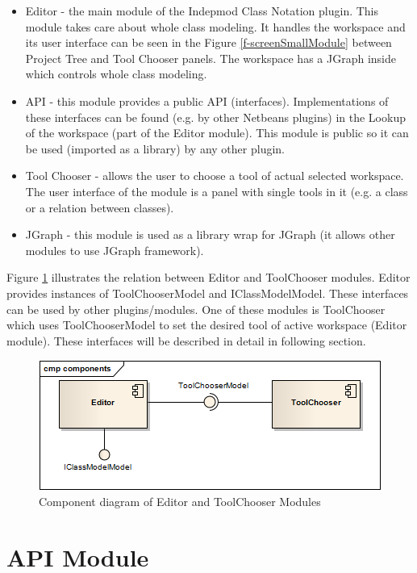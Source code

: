 \begin{itemize}
	\item Editor - the main module of the Indepmod Class Notation plugin. This module takes care about whole class modeling. It handles the workspace and its user interface can be seen in the Figure \ref{f-screenSmallModule} between Project Tree and Tool Chooser panels. The workspace has a JGraph inside which controls whole class modeling.
    \item API - this module provides a public API (interfaces). Implementations of these interfaces can be found (e.g. by other Netbeans plugins) in the Lookup of the workspace (part of the Editor module). This module is public so it can be used (imported as a library) by any other plugin.
    \item Tool Chooser - allows the user to choose a tool of actual selected workspace. The user interface of the module is a panel with single tools in it (e.g. a class or a relation between classes).
    \item JGraph - this module is used as a library wrap for JGraph (it allows other modules to use JGraph framework).
\end{itemize} 

Figure \ref{f-Editor_ToolChooser_Components} illustrates the relation between Editor and ToolChooser modules. Editor provides instances of ToolChooserModel and IClassModelModel. These interfaces can be used by other plugins/modules. One of these modules is ToolChooser which uses ToolChooserModel to set the desired tool of active workspace (Editor module). These interfaces will be described in detail in following section.

\begin{figure}[!ht]
\begin{center}
\includegraphics{img/Editor_ToolChooser_Components.png}
\caption{Component diagram of Editor and ToolChooser Modules}
\label{f-Editor_ToolChooser_Components}
\end{center}
\end{figure}

\section{API Module}

